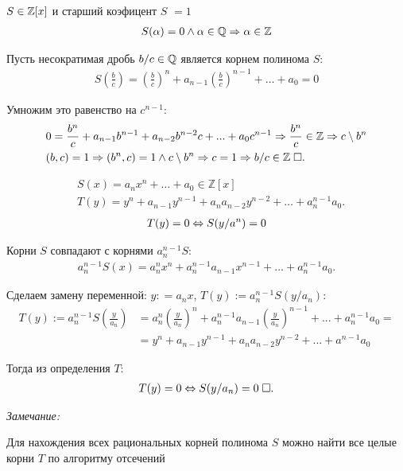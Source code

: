 \documentclass{article}
\begin{document}
\theorem

$S\in\mathbb{Z}[x]$ и старший коэфицент $S$ $=1$
\begin{align*}
	S(\alpha)=0\land\alpha\in\mathbb{Q}\Rightarrow\alpha\in\mathbb{Z}
\end{align*}

\proof

Пусть несократимая дробь $b/c\in\mathbb{Q}$ является корнем полинома $S$:
\begin{align*}
	S\left(\frac{b}{c}\right)=\left(\frac{b}{c}\right)^n+a_{n-1} \left(\frac{b}{c}\right)^{n-1}+\ldots +a_0=0
\end{align*}

Умножим это равенство на $c^{n-1}$:
\begin{align*}
	 & 0=\frac{b^n}{c}+a_{n-1} b^{n-1}+a_{n-2} b^{n-2} c+...+a_0 c^{n-1}\Rightarrow \frac{b^{n}}{c}\in\mathbb{Z}\Rightarrow c\setminus b^{n} \\
	 & (b,c)=1\Rightarrow(b^{n},c)=1\land c\setminus b^{n}\Rightarrow c=1\Rightarrow b/c\in\mathbb{Z}\;\square.
\end{align*}

\theorem
\begin{align*}
	 & S(x)=a_n x^n+\ldots +a_0\in\mathbb{Z} [x]                           \\
	 & T(y)=y^n+a_{n-1} y^{n-1}+a_n a_{n-2} y^{n-2}+\ldots +a^{n-1}_n a_0.
\end{align*}
\begin{align*}
	T(y)=0\Leftrightarrow S(y/a^{n})=0
\end{align*}

\proof

Корни $S$ совпадают с корнями $a_{n}^{n-1}S$:
\begin{align*}
	a^{n-1}_n S(x)=a^n_n x^n+a^{n-1}_n a_{n-1} x^{n-1}+\ldots +a^{n-1}_n a_0.
\end{align*}

Сделаем замену переменной: $y: = a_n x$, $T(y):=a_{n}^{n-1}S(y/a_{n})$:
\begin{align*}
	T(y):=a_{n}^{n-1}S\left(\frac{y}{a_{n}}\right) & =a_{n}^{n}\left(\frac{y}{a_{n}}\right)^{n}+a_{n}^{n-1}a_{n-1}\left(\frac{y}{a_{n}}\right)^{n-1}+...+a_{n}^{n-1}a_0= \\
	                                               & =y^{n}+a_{n-1}y^{n-1}+a_{n}a_{n-2}y^{n-2}+...+a^{n-1}a_0
\end{align*}

Тогда из определения $T$:
\begin{align*}
	T(y)=0\Leftrightarrow S(y/a_{n})=0\;\square.
\end{align*}

{\it Замечание:}

Для нахождения всех рациональных корней полинома $S$ можно найти все целые корни $T$ по алгоритму отсечений
\end{document}
